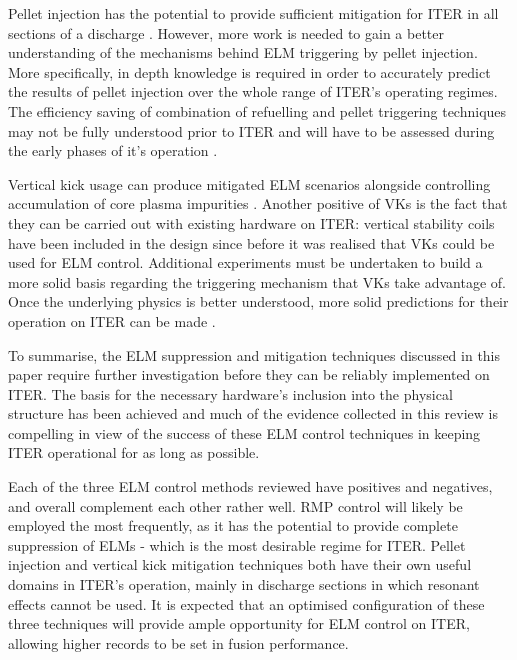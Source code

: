 \documentclass[11pt, twocolumn]{article}  %
\newcommand{\citep}[1]{\cite{#1}}
\begin{document}
Pellet injection has the potential to provide sufficient mitigation for ITER in all sections of a discharge \citep{Baylor2015}. However, more work is needed to gain a better understanding of the mechanisms behind ELM triggering by pellet injection. More specifically, in depth knowledge is required in order to accurately predict the results of pellet injection over the whole range of ITER's operating regimes. The efficiency saving of combination of refuelling and pellet triggering techniques may not be fully understood prior to ITER and will have to be assessed during the early phases of it's operation \citep{Baylor2015}.

Vertical kick usage can produce mitigated ELM scenarios alongside controlling accumulation of core plasma impurities \cite{DelaLuna2016}. Another positive of VKs is the fact that they can be carried out with existing hardware on ITER: vertical stability coils have been included in the design since before it was realised that VKs could be used for ELM control. Additional experiments must be undertaken to build a more solid basis regarding the triggering mechanism that VKs take advantage of. Once the underlying physics is better understood, more solid predictions for their operation on ITER can be made \citep{DelaLuna2016}.

To summarise, the ELM suppression and mitigation techniques discussed in this paper require further investigation before they can be reliably implemented on ITER. The basis for the necessary hardware's inclusion into the physical structure has been achieved and much of the evidence collected in this review is compelling in view of the success of these ELM control techniques in keeping ITER operational for as long as possible.

Each of the three ELM control methods reviewed have positives and negatives, and overall complement each other rather well. RMP control will likely be employed the most frequently, as it has the potential to provide complete suppression of ELMs - which is the most desirable regime for ITER. Pellet injection and vertical kick mitigation techniques both have their own useful domains in ITER's operation, mainly in discharge sections in which resonant effects cannot be used. It is expected that an optimised configuration of these three techniques will provide ample opportunity for ELM control on ITER, allowing higher records to be set in fusion performance.


\printbibliography
\end{document}
